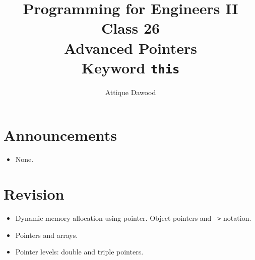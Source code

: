 \documentclass[12pt,a4paper]{article}
\title{\vspace{-2cm}Programming for Engineers II\\Class 26\\Advanced Pointers\\Keyword \texttt{this}}
\author{Attique Dawood}
\begin{document}
\maketitle
\section{Announcements}
\begin{itemize}
\item None.
\end{itemize}
\section{Revision}
\begin{itemize}
\item Dynamic memory allocation using pointer. Object pointers and \verb|->| notation.
\item Pointers and arrays.
\item Pointer levels: double and triple pointers.
\end{itemize}
\end{document}
